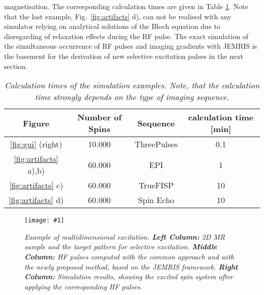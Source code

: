 \documentclass{nic-series}
\newcommand{\epsfigure}[5]{
 \begin{figure}[#4!]
   \begin{center}
    \texttt{[image: \#1]}
    \caption{{\sl #2}\label{#3}}
   \end{center}
 \end{figure}}
\begin{document}
magnetisation. The corresponding calculation times are given in Table \ref{tab:calctimes}. Note that the last example,
Fig.~\ref{fig:artifacts} d), can not be realised with any simulator relying on analytical solutions of the Bloch
equation due to disregarding of relaxation effects during the RF pulse. The exact simulation of the simultaneous occurrence of RF
pulses and imaging gradients with JEMRIS is the basement for the derivation of new selective excitation pulses in the next section.
\begin{small}
 \begin{table}[tp]
  {\footnotesize
  \begin{center}
  \begin{tabular}{|c|c|c|c|}
  \hline
        Figure & Number of Spins & Sequence & calculation time [min] \\
  \hline
	\ref{fig:gui} (right)    & 10.000     & ThreePulses & 0.1 \\
	\ref{fig:artifacts} a),b)& 60.000     & EPI         & 1 \\
	\ref{fig:artifacts} c)   & 60.000     & TrueFISP    & 10 \\
	\ref{fig:artifacts} d)   & 60.000     & Spin Echo   & 10 \\
  \hline
  \end{tabular}
  \end{center}
  }
  \caption{\label{tab:calctimes}
           {\it Calculation times of the simulation examples. Note, that the calculation time strongly depends
		on the type of imaging sequence.}}
 \end{table}
\end{small}
\epsfigure{fig/Selex.eps}{Example of multidimensional excitation. {\bf Left Column:} 2D MR sample and the target pattern for selective
			     excitation. {\bf Middle Column:} HF pulses computed with the common approach and with the newly proposed method,
			     based on the JEMRIS framework. {\bf Right Column:} Simulation results, showing the excited spin
			     system after applying the corresponding HF pulses.}{fig:selex}{bp}{0.7}
\end{document}
